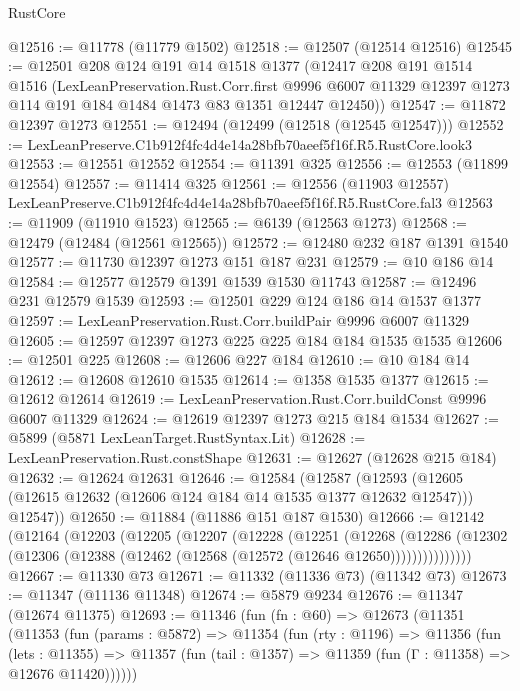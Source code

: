 \begin{lexlean}{RustCore}
\begin{coremodule}
@12516 := @11778 (@11779 @1502)
@12518 := @12507 (@12514 @12516)
@12545 := @12501
    @208
    @124
    @191
    @14
    @1518
    @1377
    (@12417
      @208
      @191
      @1514
      @1516
      (LexLeanPreservation.Rust.Corr.first
        @9996
        @6007
        @11329
        @12397
        @1273
        @114
        @191
        @184
        @1484
        @1473
        @83
        @1351
        @12447
        @12450))
@12547 := @11872 @12397 @1273
@12551 := @12494 (@12499 (@12518 (@12545 @12547)))
@12552 := LexLeanPreserve.C1b912f4fc4d4e14a28bfb70aeef5f16f.R5.RustCore.look3
@12553 := @12551 @12552
@12554 := @11391 @325
@12556 := @12553 (@11899 @12554)
@12557 := @11414 @325
@12561 := @12556 (@11903 @12557) LexLeanPreserve.C1b912f4fc4d4e14a28bfb70aeef5f16f.R5.RustCore.fal3
@12563 := @11909 (@11910 @1523)
@12565 := @6139 (@12563 @1273)
@12568 := @12479 (@12484 (@12561 @12565))
@12572 := @12480 @232 @187 @1391 @1540
@12577 := @11730 @12397 @1273 @151 @187 @231
@12579 := @10 @186 @14
@12584 := @12577 @12579 @1391 @1539 @1530 @11743
@12587 := @12496 @231 @12579 @1539
@12593 := @12501 @229 @124 @186 @14 @1537 @1377
@12597 := LexLeanPreservation.Rust.Corr.buildPair @9996 @6007 @11329
@12605 := @12597 @12397 @1273 @225 @225 @184 @184 @1535 @1535
@12606 := @12501 @225
@12608 := @12606 @227 @184
@12610 := @10 @184 @14
@12612 := @12608 @12610 @1535
@12614 := @1358 @1535 @1377
@12615 := @12612 @12614
@12619 := LexLeanPreservation.Rust.Corr.buildConst @9996 @6007 @11329
@12624 := @12619 @12397 @1273 @215 @184 @1534
@12627 := @5899 (@5871 LexLeanTarget.RustSyntax.Lit)
@12628 := LexLeanPreservation.Rust.constShape
@12631 := @12627 (@12628 @215 @184)
@12632 := @12624 @12631
@12646 := @12584
    (@12587
      (@12593 (@12605 (@12615 @12632 (@12606 @124 @184 @14 @1535 @1377 @12632 @12547))) @12547))
@12650 := @11884 (@11886 @151 @187 @1530)
@12666 := @12142
    (@12164
      (@12203
        (@12205
          (@12207
            (@12228
              (@12251
                (@12268
                  (@12286
                    (@12302 (@12306 (@12388 (@12462 (@12568 (@12572 (@12646 @12650)))))))))))))))
@12667 := @11330 @73
@12671 := @11332 (@11336 @73) (@11342 @73)
@12673 := @11347 (@11136 @11348)
@12674 := @5879 @9234
@12676 := @11347 (@12674 @11375)
@12693 := @11346
    (fun (fn : @60) =>
    @12673
      (@11351
        (@11353
          (fun (params : @5872) =>
          @11354
            (fun (rty : @1196) =>
            @11356
              (fun (lets : @11355) =>
              @11357 (fun (tail : @1357) => @11359 (fun (Γ : @11358) => @12676 @11420))))))

\end{coremodule}
\end{lexlean}
